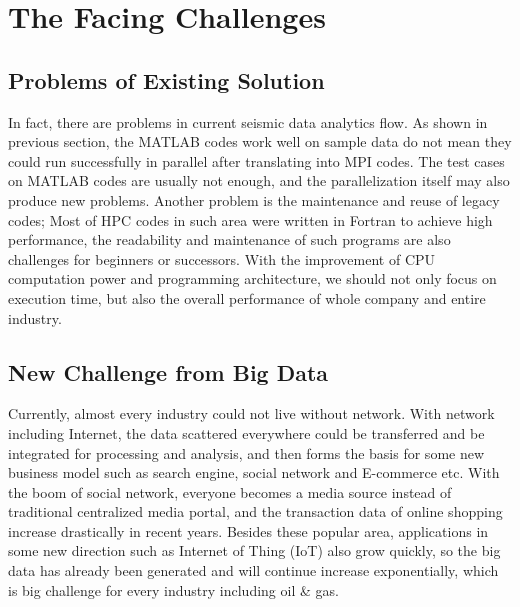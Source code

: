 \section{The Facing Challenges}

\subsection{Problems of Existing Solution}
In fact, there are problems in current seismic data analytics flow. As shown in previous section, the MATLAB codes work well on sample data do not mean they could run successfully in parallel after translating into MPI codes. The test cases on MATLAB codes are usually not enough, and the parallelization itself may also produce new problems.
Another problem is the maintenance and reuse of legacy codes; Most of HPC codes in such area were written in Fortran to achieve high performance, the readability and maintenance of such programs are also challenges for beginners or successors. With the improvement of CPU computation power and programming architecture, we should not only focus on execution time, but also the overall performance of whole company and entire industry. 

\subsection{New Challenge from Big Data}
Currently, almost every industry could not live without network. With network including Internet, the data scattered everywhere could be transferred and be integrated for processing and analysis, and then forms the basis for some new business model such as search engine, social network and E-commerce etc. With the boom of social network, everyone becomes a media source instead of traditional centralized media portal, and the transaction data of online shopping increase drastically in recent years. Besides these popular area, applications in some new direction such as Internet of Thing (IoT) also grow quickly, so the big data has already been generated and will continue increase exponentially, which is big challenge for every industry including oil \& gas. 

